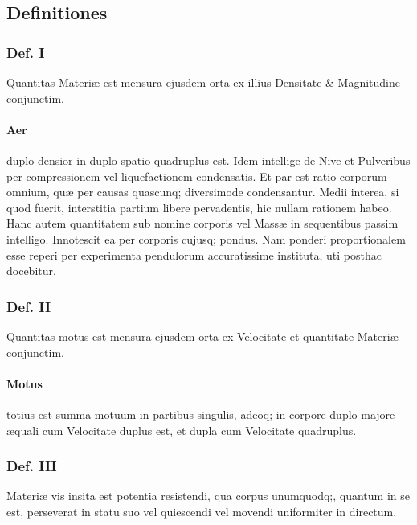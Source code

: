 \documentclass{ansarticle}
\begin{document}
\subsection{Definitiones}

\subsubsection{Def. I}

Quantitas Materi\ae{} est mensura ejusdem orta ex illius Densitate \&
Magnitudine conjunctim.

\paragraph{Aer}  duplo densior in duplo spatio quadruplus est. Idem
intellige de Nive et Pulveribus per compressionem vel liquefactionem
condensatis. Et par est ratio corporum omnium, qu\ae{} per causas
quascunq; diversimode condensantur. Medii interea, si quod fuerit,
interstitia partium libere pervadentis, hic nullam rationem
habeo. Hanc autem quantitatem sub nomine corporis vel Mass\ae{} in
sequentibus passim intelligo. Innotescit ea per corporis cujusq;
pondus. Nam ponderi proportionalem esse reperi per experimenta
pendulorum accuratissime instituta, uti posthac docebitur.

\subsubsection{Def. II}
Quantitas motus est mensura ejusdem orta ex Velocitate et quantitate
Materi\ae{} conjunctim.

\paragraph{Motus}
totius est summa motuum in partibus singulis, adeoq; in corpore duplo
majore \ae{}quali cum Velocitate duplus est, et dupla cum Velocitate
quadruplus.

\subsubsection{Def. III}
Materi\ae{} vis insita est potentia resistendi, qua corpus unumquodq;,
quantum in se est, perseverat in statu suo vel quiescendi vel movendi
uniformiter in directum.
\end{document}
